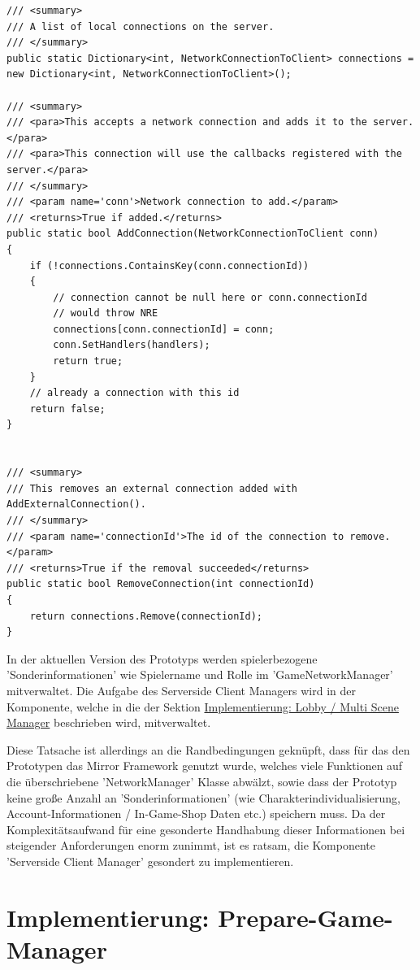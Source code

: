 \begin{lstlisting}[caption= Mirror Class NetworkServer.cs Connection Handling]
/// <summary>
/// A list of local connections on the server.
/// </summary>
public static Dictionary<int, NetworkConnectionToClient> connections = new Dictionary<int, NetworkConnectionToClient>();

/// <summary>
/// <para>This accepts a network connection and adds it to the server.</para>
/// <para>This connection will use the callbacks registered with the server.</para>
/// </summary>
/// <param name='conn'>Network connection to add.</param>
/// <returns>True if added.</returns>
public static bool AddConnection(NetworkConnectionToClient conn)
{
	if (!connections.ContainsKey(conn.connectionId))
	{
		// connection cannot be null here or conn.connectionId
		// would throw NRE
		connections[conn.connectionId] = conn;
		conn.SetHandlers(handlers);
		return true;
	}
	// already a connection with this id
	return false;
}


/// <summary>
/// This removes an external connection added with AddExternalConnection().
/// </summary>
/// <param name='connectionId'>The id of the connection to remove.</param>
/// <returns>True if the removal succeeded</returns>
public static bool RemoveConnection(int connectionId)
{
	return connections.Remove(connectionId);
}
\end{lstlisting}

In der aktuellen Version des Prototyps werden spielerbezogene 'Sonderinformationen' wie Spielername und Rolle im 'GameNetworkManager'  mitverwaltet. Die Aufgabe des Serverside Client Managers wird in der Komponente, welche in die der Sektion \hyperref[Lobby Manager Implementierung]{Implementierung: Lobby / Multi Scene Manager} beschrieben wird, mitverwaltet. 

Diese Tatsache ist allerdings an die Randbedingungen geknüpft, dass für das den Prototypen das Mirror Framework genutzt wurde, welches viele Funktionen auf die überschriebene 'NetworkManager' Klasse abwälzt, sowie dass der Prototyp keine große Anzahl an 'Sonderinformationen' (wie Charakterindividualisierung, Account-Informationen / In-Game-Shop Daten etc.) speichern muss. Da der Komplexitätsaufwand für eine gesonderte Handhabung dieser Informationen bei steigender Anforderungen enorm zunimmt, ist es ratsam, die Komponente 'Serverside Client Manager' gesondert zu implementieren.

\section{Implementierung: Prepare-Game-Manager}
\label{Implementierung:prepare_game_manager}

